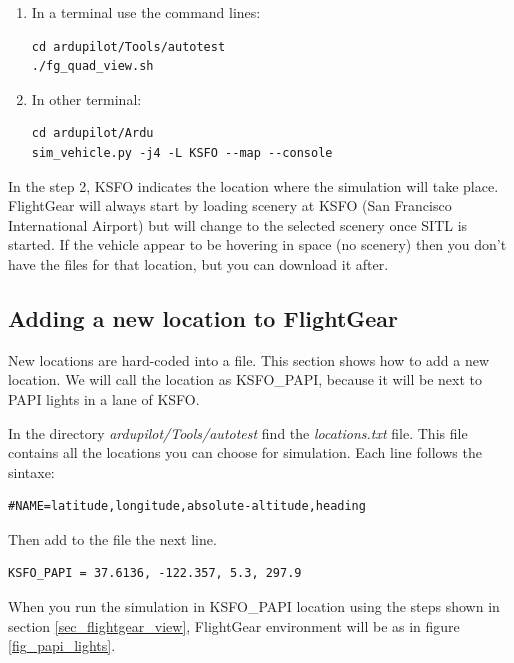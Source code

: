 \begin{enumerate}
\item In a terminal use the command lines:
\begin{verbatim} 
cd ardupilot/Tools/autotest
./fg_quad_view.sh 
\end{verbatim}

\item In other terminal:
\begin{verbatim} 
cd ardupilot/Ardu
sim_vehicle.py -j4 -L KSFO --map --console
\end{verbatim}

\end{enumerate}

In the step 2, KSFO indicates the location where the simulation will take place. FlightGear will always start by loading scenery at KSFO (San Francisco International Airport) but will change to the selected scenery once SITL is started.
If the vehicle appear to be hovering in space (no scenery) then you don't have the files for that location, but you can download it after. 

\subsection{Adding a new location to FlightGear}
	
    New locations are hard-coded into a file. This section shows how to add a new location. We will call the location as KSFO\_PAPI, because it will be next to PAPI lights in a lane of KSFO.
    
    In the directory \textit{ardupilot/Tools/autotest} find the \textit{locations.txt} file. This file contains all the locations you can choose for simulation. Each line follows the sintaxe:

\begin{verbatim}
#NAME=latitude,longitude,absolute-altitude,heading
\end{verbatim}  

Then add to the file the next line. 
\begin{verbatim}
KSFO_PAPI = 37.6136, -122.357, 5.3, 297.9
\end{verbatim}  
When you run the simulation in KSFO\_PAPI location using the steps shown in section \ref{sec_flightgear_view}, FlightGear environment will be as in figure \ref{fig_papi_lights}.

